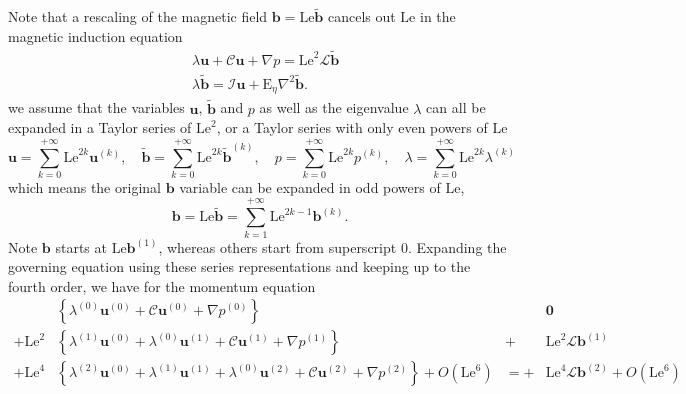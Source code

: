 Note that a rescaling of the magnetic field $\mathbf{b} = \mathrm{Le} \tilde{\mathbf{b}}$ cancels out $\mathrm{Le}$ in the magnetic induction equation 
%
\begin{equation}
    \begin{aligned}
        &\lambda \mathbf{u} + \mathcal{C} \mathbf{u} + \nabla p = \mathrm{Le}^2 \mathcal{L} \tilde{\mathbf{b}} \\ 
        &\lambda \tilde{\mathbf{b}} = \mathcal{I} \mathbf{u} + \mathrm{E}_\eta \nabla^2 \tilde{\mathbf{b}}.
    \end{aligned}
\end{equation}
%
we assume that the variables $\mathbf{u}$, $\tilde{\mathbf{b}}$ and $p$ as well as the eigenvalue $\lambda$ can all be expanded in a Taylor series of $\mathrm{Le}^2$, or a Taylor series with only even powers of $\mathrm{Le}$
%
\begin{equation}
    \mathbf{u} = \sum_{k=0}^{+\infty} \mathrm{Le}^{2k} \mathbf{u}^{(k)}, \quad 
    \tilde{\mathbf{b}} = \sum_{k=0}^{+\infty} \mathrm{Le}^{2k} \tilde{\mathbf{b}}^{(k)}, \quad 
    p = \sum_{k=0}^{+\infty} \mathrm{Le}^{2k} p^{(k)}, \quad 
    \lambda = \sum_{k=0}^{+\infty} \mathrm{Le}^{2k} \lambda^{(k)}
\end{equation}
%
which means the original $\mathbf{b}$ variable can be expanded in odd powers of $\mathrm{Le}$,
%
\begin{equation}
    \mathbf{b} = \mathrm{Le} \tilde{\mathbf{b}} = \sum_{k=1}^{+\infty} \mathrm{Le}^{2k-1} \mathbf{b}^{(k)}.
\end{equation}
%
Note $\mathbf{b}$ starts at $\mathrm{Le} \mathbf{b}^{(1)}$, whereas others start from superscript $0$. Expanding the governing equation using these series representations and keeping up to the fourth order, we have for the momentum equation
%
\begin{equation}
    \begin{aligned}
        & \left\{\lambda^{(0)} \mathbf{u}^{(0)} + \mathcal{C} \mathbf{u}^{(0)} + \nabla p^{(0)}\right\} & & \mathbf{0} \\
        + \mathrm{Le}^2 & \left\{\lambda^{(1)} \mathbf{u}^{(0)} + \lambda^{(0)} \mathbf{u}^{(1)} + \mathcal{C} \mathbf{u}^{(1)} + \nabla p^{(1)}\right\} & +&\mathrm{Le}^2 \mathcal{L} \mathbf{b}^{(1)} \\
        + \mathrm{Le}^4 & \left\{\lambda^{(2)} \mathbf{u}^{(0)} + \lambda^{(1)} \mathbf{u}^{(1)} + \lambda^{(0)} \mathbf{u}^{(2)} + \mathcal{C} \mathbf{u}^{(2)} + \nabla p^{(2)}\right\} + O\left(\mathrm{Le}^6\right) & =+& \mathrm{Le}^4\mathcal{L}\mathbf{b}^{(2)} + O\left(\mathrm{Le}^6\right) \\ 
    \end{aligned}
\end{equation}

